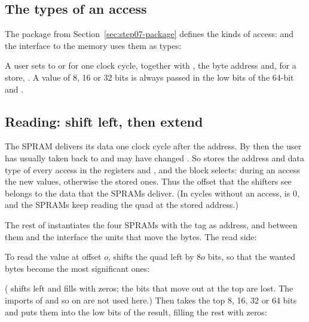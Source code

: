 \subsection*{The types of an access}

The package  from Section~\ref{sec:step07-package} defines the
kinds of access:
and the interface to the memory uses them as types:


A user sets  to  or  for one clock cycle,
together with , the byte address  and, for a store,
. A value of 8, 16 or 32 bits is always passed in the low bits of
the 64-bit  and .

\subsection*{Reading: shift left, then extend}


The SPRAM delivers its data one clock cycle after the address. By then the
user has usually taken  back to  and may have changed
. So  stores the address and data type of every access in
the registers  and , and the  block
selects: during an access the new values, otherwise the stored ones. Thus the
offset that the shifters see belongs to the data that the SPRAMs deliver. (In
cycles without an access,  is 0, and the SPRAMs keep reading the quad at
the stored address.)

The rest of  instantiates the four SPRAMs with the tag as
address, and between them and the interface the units that move the bytes.
The read side:


To read the value at offset $o$,  shifts the quad left by $8o$
bits, so that the wanted bytes become the most significant ones:


(\cc{<<} shifts left and fills with zeros; the bits that move out at the top are
lost. The imports of  and so on are not used here.) Then
 takes the top 8, 16, 32 or 64 bits and puts them into the
low bits of the result, filling the rest with zeros:

